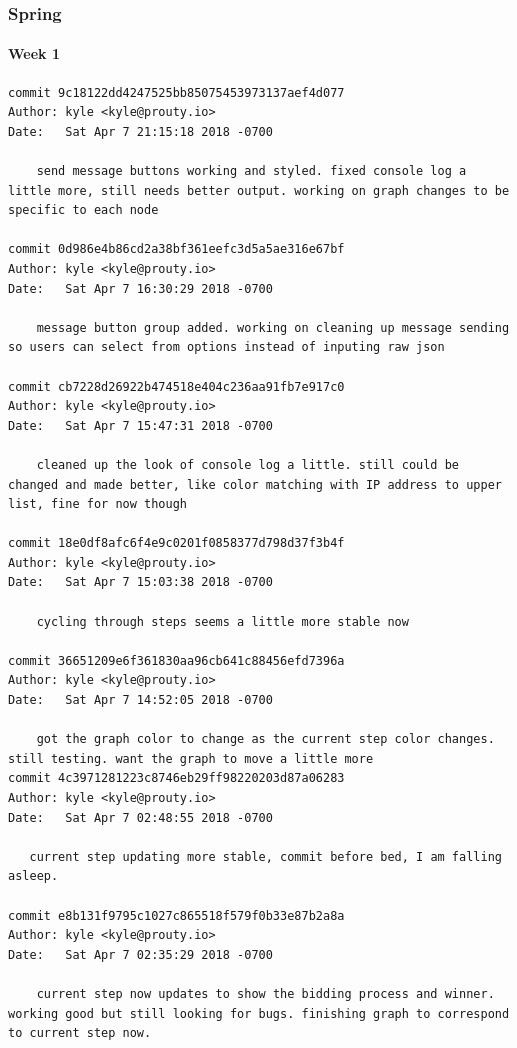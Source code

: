\documentclass[draftclsnofoot, onecolumn, compsoc, 10pt]{IEEEtran}
\begin{document}
\subsubsection{Spring}
\paragraph{Week 1}
\begin{lstlisting}
commit 9c18122dd4247525bb85075453973137aef4d077 
Author: kyle <kyle@prouty.io> 
Date:   Sat Apr 7 21:15:18 2018 -0700 

    send message buttons working and styled. fixed console log a little more, still needs better output. working on graph changes to be specific to each node 

commit 0d986e4b86cd2a38bf361eefc3d5a5ae316e67bf 
Author: kyle <kyle@prouty.io> 
Date:   Sat Apr 7 16:30:29 2018 -0700 

    message button group added. working on cleaning up message sending so users can select from options instead of inputing raw json 

commit cb7228d26922b474518e404c236aa91fb7e917c0 
Author: kyle <kyle@prouty.io> 
Date:   Sat Apr 7 15:47:31 2018 -0700 

    cleaned up the look of console log a little. still could be changed and made better, like color matching with IP address to upper list, fine for now though 

commit 18e0df8afc6f4e9c0201f0858377d798d37f3b4f 
Author: kyle <kyle@prouty.io> 
Date:   Sat Apr 7 15:03:38 2018 -0700 

    cycling through steps seems a little more stable now 

commit 36651209e6f361830aa96cb641c88456efd7396a 
Author: kyle <kyle@prouty.io> 
Date:   Sat Apr 7 14:52:05 2018 -0700 

    got the graph color to change as the current step color changes. still testing. want the graph to move a little more 
commit 4c3971281223c8746eb29ff98220203d87a06283 
Author: kyle <kyle@prouty.io> 
Date:   Sat Apr 7 02:48:55 2018 -0700 

   current step updating more stable, commit before bed, I am falling asleep. 

commit e8b131f9795c1027c865518f579f0b33e87b2a8a 
Author: kyle <kyle@prouty.io> 
Date:   Sat Apr 7 02:35:29 2018 -0700 

    current step now updates to show the bidding process and winner. working good but still looking for bugs. finishing graph to correspond to current step now. 


\end{lstlisting}
\end{document}
